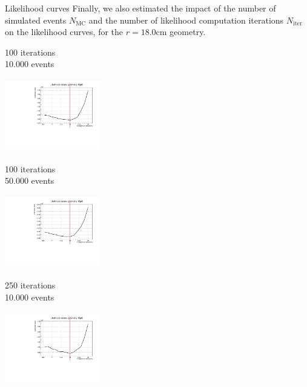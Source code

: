 \documentclass[8 pt]{beamer}
\begin{document}
\begin{frame}{Likelihood curves}
\justifying
Finally, we also estimated the impact of the number of simulated events $N_{\text{MC}}$ and the number of likelihood computation iterations $N_{\text{iter}}$ on the likelihood curves, for the $r = 18.0$cm geometry.

\begin{minipage}[c]{.32\textwidth}
\begin{exampleblock}{} \begin{center}100 iterations \\ 10.000 events\end{center} \end{exampleblock} \vspace{5pt}
\includegraphics[width=4.2cm, height=3.2cm]{figs/likelihood100LowStat/likelihood18p0.pdf} 
\end{minipage}
\begin{minipage}[c]{.32\textwidth}
\begin{exampleblock}{} \begin{center}100 iterations \\ 50.000 events\end{center} \end{exampleblock} \vspace{5pt}
\includegraphics[width=4.2cm, height=3.2cm]{figs/likelihood100HighStat/likelihood18p0.pdf} 
\end{minipage}
\begin{minipage}[c]{.32\textwidth}
\begin{exampleblock}{} \begin{center}250 iterations \\ 10.000 events\end{center} \end{exampleblock} \vspace{5pt}
\includegraphics[width=4.2cm, height=3.2cm]{figs/likelihood250LowStat/likelihood18p0.pdf} 
\end{minipage} \vfill


\end{frame}
\end{document}
